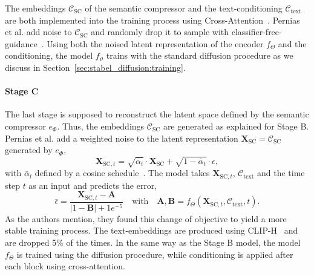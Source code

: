 The embeddings $\mathcal{C}_{\text{SC}}$ of the semantic compressor and the
text-conditioning $\mathcal{C}_{\text{text}}$ are both implemented into the training process using Cross-Attention~\cite{vaswani2023attentionneed}.
Pernias et al. add noise to $\mathcal{C}_{\text{SC}}$ and randomly drop it to
sample with classifier-free-guidance~\cite{ho2022classifierfreediffusionguidance}.
Using both the noised latent representation of the encoder $f_\Theta$ and the
conditioning, the model $f_\vartheta$ trains with the standard diffusion
procedure as we discuss in Section~\ref{sec:stabel_diffusion:training}.

\paragraph*{Stage C} The last stage is supposed to reconstruct the latent space
defined by the semantic compressor $e_\Phi$. Thus, the embeddings
$\mathcal{C}_{\text{SC}}$ are generated as explained for Stage B. Pernias et
al. add a weighted noise to the latent representation
$\boldsymbol{X}_{\text{SC}} = \mathcal{C}_{\text{SC}}$ generated by $e_\Phi$,
\begin{equation}
    \boldsymbol{X}_{\text{SC}, t} = \sqrt{\bar{\alpha}_t}\cdot\boldsymbol{X}_{\text{SC}}+\sqrt{1-\bar{\alpha}_t}\cdot\epsilon,
\end{equation}
with $\bar{\alpha}_t$ defined by a cosine schedule~\cite{Nichol2021ImprovedDenoisingDiffusionProbabilisticModels}.
The model takes $\boldsymbol{X}_{\text{SC}, t}$, $\mathcal{C}_{\text{text}}$ and
the time step $t$ as an input and predicts the error,
\begin{equation}
    \bar{\epsilon} = \frac{\boldsymbol{X}_{\text{SC}, t} - \boldsymbol{A}}{|1-\boldsymbol{B}| + 1e^{-5}} \quad \text{with} \quad \boldsymbol{A}, \boldsymbol{B} = f_\Theta(\boldsymbol{X}_{\text{SC}, t},\mathcal{C}_{\text{text}}, t).
\end{equation}
As the authors mention, they found this change of objective to yield a more
stable training process. The text-embeddings are produced using
CLIP-H~\cite{Ilharco2021OpenCLIP} and are dropped 5\% of the times. In the same
way as the Stage B model, the model $f_\Theta$ is trained using the diffusion
procedure, while conditioning is applied after each block using cross-attention.